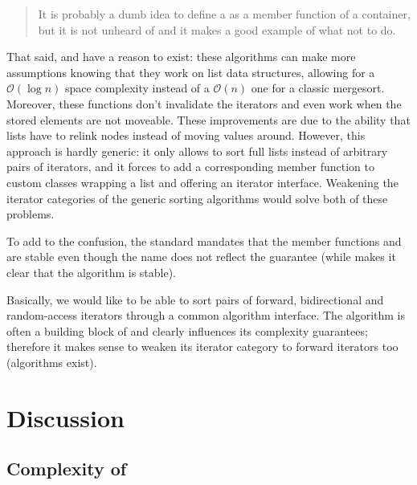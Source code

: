 \documentclass{isocpp_proposal}
\begin{document}
\begin{quotation}
It is probably a dumb idea to define a  as a member function of a container, but it is not unheard of and it makes a good example of what not to do.
\end{quotation}

That said,  and  have a reason to exist: these algorithms can make more assumptions knowing that they work on list data structures, allowing for a  $\mathcal{O}(\log{} n)$ space complexity instead of a  $\mathcal{O}(n)$ one for a classic mergesort. Moreover, these functions don't invalidate the iterators and even work when the stored elements are not moveable. These improvements are due to the ability that lists have to relink nodes instead of moving values around. However, this approach is hardly generic: it only allows to sort full lists instead of arbitrary pairs of iterators, and it forces to add a corresponding member function  to custom classes wrapping a list and offering an iterator interface. Weakening the iterator categories of the generic sorting algorithms would solve both of these problems.

\vspace{0.3cm}

To add to the confusion, the standard mandates that the member functions  and  are stable even though the name does not reflect the guarantee (while  makes it clear that the algorithm is stable).

\vspace{0.3cm}

Basically, we would like to be able to sort pairs of forward, bidirectional and random-access iterators through a common algorithm interface. The algorithm  is often a building block of  and clearly influences its complexity guarantees; therefore it makes sense to weaken its iterator category to forward iterators too (algorithms exist).

\section{Discussion}

\subsection{Complexity of }
\end{document}

